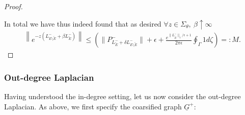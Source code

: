 \documentclass[reqno,12pt,letterpaper]{amsart}
\numberwithin{equation}{section}
\newcommand{\Lin}{L^{-}}
\newcommand{\1}{\mathds{1}}
\theoremstyle{definition}
\begin{document}
\begin{proof}
\begin{minipage}[b]{0.4\textwidth}
\begin{tikzpicture}[scale=2]
	
	
	
	
\end{tikzpicture}




		\label{integration_path}
	\end{minipage}

 \noindent In total we  have thus indeed found that as desired $\forall z \in \Sigma_\theta,\ \beta \uparrow \infty$
\begin{align}
	\left\|e^{-z(\Lin_{E\setminus \tilde{E}} + \beta \Lin_{\tilde{E}})}\right\|  \leq \left(\|P^-_{\Lin_{\tilde{E}} + \delta \Lin_{E\setminus \tilde{E}}}\|  + \epsilon +  \frac{e^{\|\Lin_{\tilde{E}}\|_1/\epsilon + 1}}{2\pi \epsilon} \oint_\Gamma 1 d\zeta \right)=: M.
\end{align} 
\end{proof}
	
	
	
	
	




	
\subsubsection{Out-degree Laplacian} Having understood the in-degree setting, let us now consider the out-degree Laplacian. As above, we first specify the coarsified  graph $\underline{G}^+$:
\end{document}

